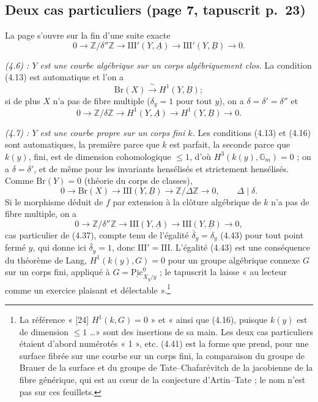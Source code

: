 \documentclass[11pt,a4paper]{article}
\begin{document}
\subsection*{Deux cas particuliers (page 7, tapuscrit p.\ 23)}

La page s'ouvre sur la fin d'une suite exacte
\[
  0 \to \mathbb{Z}/\delta''\mathbb{Z} \to \mathrm{III}'(Y,\underline{A}) \to
  \mathrm{III}'(Y,\underline{B}) \to 0 . \tag{4.38}
\]

\emph{(4.6) : $Y$ est une courbe algébrique sur un corps algébriquement
clos.} La condition (4.13) est automatique et l'on a
\[
  \mathrm{Br}(X) \xrightarrow{\ \sim\ } H^{1}(Y,\underline{B}) ; \tag{4.39}
\]
si de plus $X$ n'a pas de fibre multiple ($\delta_{y} = 1$ pour tout $y$),
on a $\delta = \delta' = \delta''$ et
\[
  0 \to \mathbb{Z}/\delta\mathbb{Z} \to H^{1}(Y,\underline{A}) \to
  H^{1}(Y,\underline{B}) \to 0 . \tag{4.40}
\]

\emph{(4.7) : $Y$ est une courbe propre sur un corps fini $k$.} Les conditions
(4.13) et (4.16) sont automatiques, la première parce que $k$ est parfait,
la seconde parce que $k(y)$, fini, est de dimension cohomologique $\leq 1$,
d'où $H^{3}(k(y),\mathbb{G}_{m}) = 0$ ; on a $\delta = \delta'$, et de même
pour les invariants hensélisés et strictement hensélisés. Comme
$\mathrm{Br}(Y) = 0$ (théorie du corps de classes),
\[
  0 \to \mathrm{Br}(X) \to \mathrm{III}(Y,\underline{B}) \to
  \mathbb{Z}/\Delta\mathbb{Z} \to 0, \qquad \Delta \mid \delta . \tag{4.41}
\]
Si le morphisme déduit de $f$ par extension à la clôture algébrique de $k$
n'a pas de fibre multiple, on a
\[
  0 \to \mathbb{Z}/\delta''\mathbb{Z} \to \mathrm{III}(Y,\underline{A}) \to
  \mathrm{III}(Y,\underline{B}) \to 0, \tag{4.42}
\]
cas particulier de (4.37), compte tenu de l'égalité $\bar{\delta}_{y} =
\delta_{y}$ (4.43) pour tout point fermé $y$, qui donne ici
$\bar{\delta}_{y} = 1$, donc $\mathrm{III}' = \mathrm{III}$. L'égalité (4.43)
est une conséquence du théorème de Lang, $H^{1}(k(y), G) = 0$ pour un groupe
algébrique connexe $G$ sur un corps fini, appliqué à $G =
\underline{\mathrm{Pic}}^{0}_{X_{y}/y}$ ; le tapuscrit la laisse « au lecteur
comme un exercice plaisant et délectable ».\footnote{La référence « [24]
$H^{1}(k,G) = 0$ » et « ainsi que (4.16), puisque $k(y)$ est de dimension
$\leq 1$ \ldots » sont des insertions de sa main. Les deux cas particuliers
étaient d'abord numérotés « 1 », etc. (4.41) est la forme que prend, pour
une surface fibrée sur une courbe sur un corps fini, la comparaison du groupe
de Brauer de la surface et du groupe de Tate--Chafarévitch de la jacobienne de
la fibre générique, qui est au cœur de la conjecture d'Artin--Tate ; le nom
n'est pas sur ces feuillets.}
\end{document}
